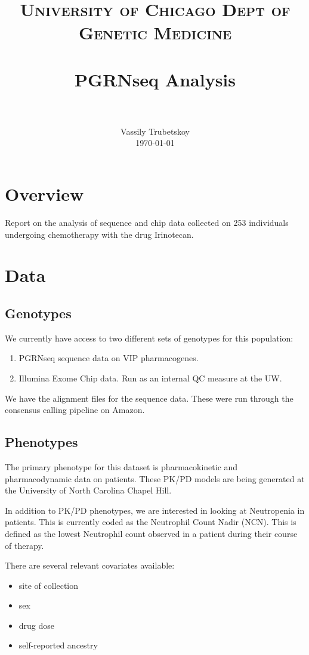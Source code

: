 \documentclass[paper=a4, fontsize=11pt]{scrartcl}	%
\title{
		\usefont{OT1}{bch}{b}{n}
		\normalfont \normalsize \textsc{University of Chicago Dept of Genetic Medicine} \\ [25pt]
		\horrule{0.5pt} \\[0.4cm]
		\huge PGRNseq Analysis \\
		\horrule{2pt} \\[0.5cm]
}
\author{
		\normalfont 								\normalsize
        Vassily Trubetskoy \\[-3pt]		\normalsize
        \today
}
\date{}
\numberwithin{equation}{section}		%
\numberwithin{figure}{section}			%
\numberwithin{table}{section}				%
\begin{document}
\maketitle

\section{Overview}

Report on the analysis of sequence and chip data collected on 253 individuals undergoing chemotherapy with the drug Irinotecan.

\newpage

\section{Data}

	\subsection{Genotypes}

We currently have access to two different sets of genotypes for this population:
	
	\begin{enumerate}
		\item PGRNseq sequence data on VIP pharmacogenes.
		\item Illumina Exome Chip data. Run as an internal QC measure at the UW.
	\end{enumerate}
	
We have the alignment files for the sequence data. These were run through the consensus calling pipeline on Amazon.

	\subsection{Phenotypes}
	
The primary phenotype for this dataset is pharmacokinetic and pharmacodynamic data on patients. These PK/PD models are being generated at the University of North Carolina Chapel Hill.

In addition to PK/PD phenotypes, we are interested in looking at Neutropenia in patients. This is currently coded as the Neutrophil Count Nadir (NCN). This is defined as the lowest Neutrophil count observed in a patient during their course of therapy.

There are several relevant covariates available:
	\begin{itemize}
		\item site of collection
		\item sex
		\item drug dose
		\item self-reported ancestry
	\end{itemize}
\end{document}
